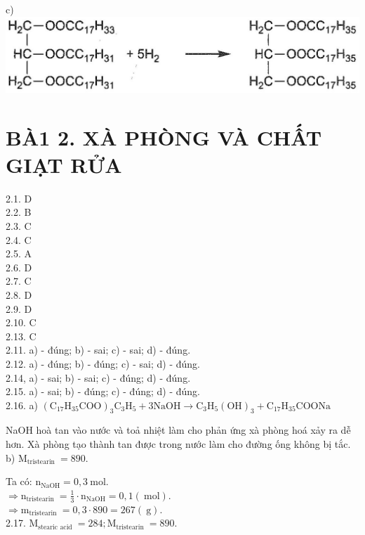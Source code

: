 \documentclass[10pt]{article}
\begin{document}
c)\\
\includegraphics[max width=\textwidth, center]{2025_10_23_b82d44049ffb48e891e8g-02(2)}

\section*{BÀ1 2. XÀ PHÒNG VÀ CHẤT GIẠT RỬA}
2.1. D\\
2.2. B\\
2.3. C\\
2.4. C\\
2.5. A\\
2.6. D\\
2.7. C\\
2.8. D\\
2.9. D\\
2.10. C\\
2.13. C\\
2.11. a) - đúng; b) - sai; c) - sai; d) - đúng.\\
2.12. a) - đúng; b) - đúng; c) - sai; d) - đúng.\\
2.14, a) - sai; b) - sai; c) - đúng; d) - đúng.\\
2.15. a) - sai; b) - đúng; c) - đúng; d) - đúng.\\
2.16. a) $\left(\mathrm{C}_{17} \mathrm{H}_{35} \mathrm{COO}\right)_{3} \mathrm{C}_{3} \mathrm{H}_{5}+3 \mathrm{NaOH} \longrightarrow \mathrm{C}_{3} \mathrm{H}_{5}(\mathrm{OH})_{3}+\mathrm{C}_{17} \mathrm{H}_{35} \mathrm{COONa}$

NaOH hoà tan vào nước và toả nhiệt làm cho phản ứng xà phòng hoá xảy ra dễ hơn. Xà phòng tạo thành tan được trong nước làm cho đường ống không bị tắc.\\
b) $\mathrm{M}_{\text {tristearin }}=890$.

Ta có: $\mathrm{n}_{\mathrm{NaOH}}=0,3 \mathrm{~mol}$.\\
$\Rightarrow \mathrm{n}_{\text {tristearin }}=\frac{1}{3} \cdot \mathrm{n}_{\mathrm{NaOH}}=0,1(\mathrm{~mol})$.\\
$\Rightarrow \mathrm{m}_{\text {tristearin }}=0,3 \cdot 890=267(\mathrm{~g})$.\\
2.17. $\mathrm{M}_{\text {stearic acid }}=284 ; \mathrm{M}_{\text {tristearin }}=890$.
\end{document}
